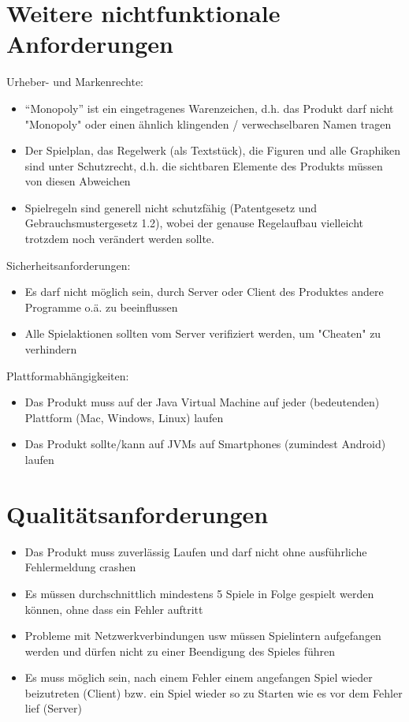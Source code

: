 \documentclass[a4paper,10pt]{article}
\begin{document}
\section{Weitere nichtfunktionale Anforderungen}
Urheber- und Markenrechte:
\begin{itemize}
\item ``Monopoly'' ist ein eingetragenes Warenzeichen, d.h. das Produkt darf nicht "Monopoly" oder einen ähnlich klingenden / verwechselbaren Namen tragen
\item Der Spielplan, das Regelwerk (als Textstück), die Figuren und alle Graphiken sind unter Schutzrecht, d.h. die sichtbaren Elemente des Produkts müssen von diesen Abweichen
\item Spielregeln sind generell nicht schutzfähig (Patentgesetz und Gebrauchsmustergesetz 1.2), wobei der genause Regelaufbau vielleicht trotzdem noch verändert werden sollte.
\end{itemize}
Sicherheitsanforderungen:
\begin{itemize}
\item Es darf nicht möglich sein, durch Server oder Client des Produktes andere Programme o.ä. zu beeinflussen
\item Alle Spielaktionen sollten vom Server verifiziert werden, um "Cheaten" zu verhindern
\end{itemize}
Plattformabhängigkeiten:
\begin{itemize}
\item Das Produkt muss auf der Java Virtual Machine auf jeder (bedeutenden) Plattform (Mac, Windows, Linux) laufen
\item Das Produkt sollte/kann auf JVMs auf Smartphones (zumindest Android) laufen
\end{itemize}
\section{Qualitätsanforderungen}
\begin{itemize}
\item Das Produkt muss zuverlässig Laufen und darf nicht ohne ausführliche Fehlermeldung crashen
\item Es müssen durchschnittlich mindestens 5 Spiele in Folge gespielt werden können, ohne dass ein Fehler auftritt
\item Probleme mit Netzwerkverbindungen usw müssen Spielintern aufgefangen werden und dürfen nicht zu einer Beendigung des Spieles führen
\item Es muss möglich sein, nach einem Fehler einem angefangen Spiel wieder beizutreten (Client) bzw. ein Spiel wieder so zu Starten wie es vor dem Fehler lief (Server)
\end{itemize}
\end{document}
